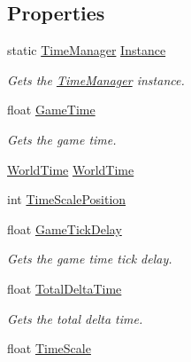 \subsection*{Properties}
\begin{DoxyCompactItemize}
\item 
static \hyperlink{class_time_manager}{Time\+Manager} \hyperlink{class_time_manager_a8c617ca2654bfe0d219d75a1c18afaad}{Instance}
\begin{DoxyCompactList}\small\item\em Gets the \hyperlink{class_time_manager}{Time\+Manager} instance. \end{DoxyCompactList}\item 
float \hyperlink{class_time_manager_ae66e23b656eaad9ea1fe2ec8ffbb4ded}{Game\+Time}
\begin{DoxyCompactList}\small\item\em Gets the game time. \end{DoxyCompactList}\item 
\hyperlink{struct_world_time}{World\+Time} \hyperlink{class_time_manager_a3a32877df68e778a84e8568a51c38f6a}{World\+Time}
\item 
int \hyperlink{class_time_manager_ac0553946947ac0ff31307c69cc073ca7}{Time\+Scale\+Position}
\item 
float \hyperlink{class_time_manager_ab76892d73eb84bacf19ffea6b603c03c}{Game\+Tick\+Delay}
\begin{DoxyCompactList}\small\item\em Gets the game time tick delay. \end{DoxyCompactList}\item 
float \hyperlink{class_time_manager_adeed4ffac282b5dfcccd1914363e5725}{Total\+Delta\+Time}
\begin{DoxyCompactList}\small\item\em Gets the total delta time. \end{DoxyCompactList}\item 
float \hyperlink{class_time_manager_a2ecf6c84dc9909554b89db8a29edca76}{Time\+Scale}

\end{DoxyCompactItemize}
